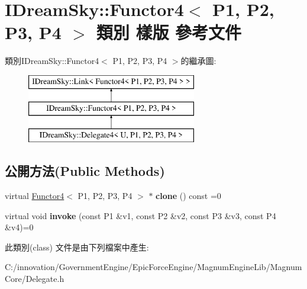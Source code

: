 \hypertarget{class_i_dream_sky_1_1_functor4}{}\section{I\+Dream\+Sky\+:\+:Functor4$<$ P1, P2, P3, P4 $>$ 類別 樣版 參考文件}
\label{class_i_dream_sky_1_1_functor4}
類別\+I\+Dream\+Sky\+:\+:Functor4$<$ P1, P2, P3, P4 $>$的繼承圖\+:\begin{figure}[H]
\begin{center}
\leavevmode
\includegraphics[height=3.000000cm]{class_i_dream_sky_1_1_functor4}
\end{center}
\end{figure}
\subsection*{公開方法(Public Methods)}
\begin{DoxyCompactItemize}
\item 
virtual \hyperlink{class_i_dream_sky_1_1_functor4}{Functor4}$<$ P1, P2, P3, P4 $>$ $\ast$ {\bfseries clone} () const  =0\hypertarget{class_i_dream_sky_1_1_functor4_a1277bbe0ecab27e29d8bdaf0da032be1}{}\label{class_i_dream_sky_1_1_functor4_a1277bbe0ecab27e29d8bdaf0da032be1}

\item 
virtual void {\bfseries invoke} (const P1 \&v1, const P2 \&v2, const P3 \&v3, const P4 \&v4)=0\hypertarget{class_i_dream_sky_1_1_functor4_af970d99c4ef23203b690b622372f41c2}{}\label{class_i_dream_sky_1_1_functor4_af970d99c4ef23203b690b622372f41c2}

\end{DoxyCompactItemize}


此類別(class) 文件是由下列檔案中產生\+:\begin{DoxyCompactItemize}
\item 
C\+:/innovation/\+Government\+Engine/\+Epic\+Force\+Engine/\+Magnum\+Engine\+Lib/\+Magnum\+Core/Delegate.\+h\end{DoxyCompactItemize}

